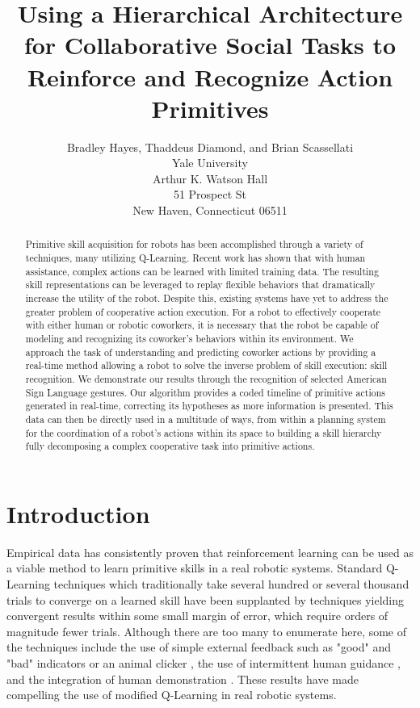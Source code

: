\documentclass[letterpaper]{article}
\begin{document}
\title{Using a Hierarchical Architecture for Collaborative Social Tasks to Reinforce and Recognize Action Primitives}
\author{Bradley Hayes, Thaddeus Diamond, and Brian Scassellati\\
Yale University\\
Arthur K. Watson Hall\\
51 Prospect St\\
New Haven, Connecticut 06511\\
}

\maketitle

\begin{abstract}
Primitive skill acquisition for robots has been accomplished through a variety
of techniques, many utilizing Q-Learning. Recent work has shown that with human
assistance, complex actions can be learned with limited training data. The
resulting skill representations can be leveraged to replay flexible behaviors
that dramatically increase the utility of the robot. Despite this, existing
systems have yet to address the greater problem of cooperative action execution.
For a robot to effectively cooperate with either human or robotic coworkers,
it is necessary that the robot be capable of modeling and recognizing its
coworker’s behaviors within its environment. We approach the task of
understanding and predicting coworker actions by providing a real-time method
allowing a robot to solve the inverse problem of skill execution: skill
recognition. We demonstrate our results through the recognition of selected
American Sign Language gestures. Our algorithm provides a coded timeline of
primitive actions generated in real-time, correcting its hypotheses as more
information is presented. This data can then be directly used in a multitude
of ways, from within a planning system for the coordination of a robot's
actions within its space to building a skill hierarchy fully
decomposing a complex cooperative task into primitive actions.
\end{abstract}

\section{Introduction}
\label{sec:intro}
Empirical data has consistently proven that reinforcement learning can be used
as a viable method to learn primitive skills in a real robotic systems.
Standard Q-Learning techniques which traditionally take several hundred or
several thousand trials to converge on a learned skill have been supplanted
by techniques yielding convergent results within some small margin of error,
which require orders of magnitude fewer trials.   Although there are too many
to enumerate here, some of the techniques include the use of simple external
feedback such as "good" and "bad" indicators \cite{TAMER} or an animal
clicker \cite{Clicker}, the use of intermittent human
guidance \cite{AdviceTaking,TeacherRL}, and the integration of human
demonstration \cite{DemonstrationRL}.  These results
have made compelling the use of modified Q-Learning in real robotic systems.
\end{document}
